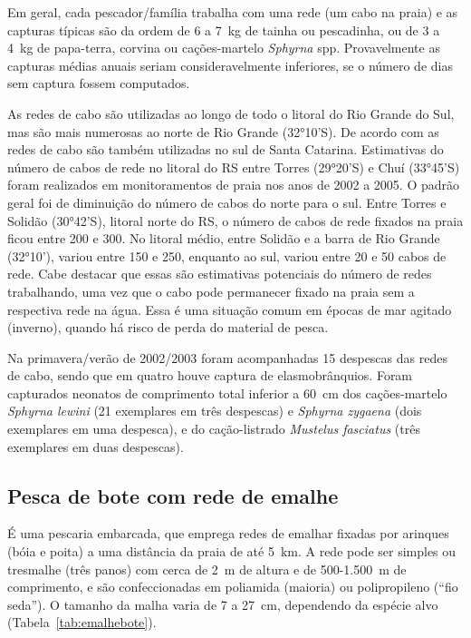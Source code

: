 \documentclass[a4paper,11pt,twoside,showtrims,onecolumn,openright,final]{memoir}
\begin{document}
Em geral, cada pescador/família trabalha com uma rede (um cabo na praia) e as capturas
típicas são da ordem de 6 a 7~kg de tainha ou pescadinha, ou de 3 a 4~kg de papa-terra,
corvina ou cações-martelo \emph{Sphyrna} spp. Provavelmente as capturas médias anuais seriam
consideravelmente inferiores, se o número de dias sem captura fossem computados.

As redes de cabo são utilizadas ao longo de todo o litoral do Rio Grande do Sul,
mas são mais numerosas ao norte de Rio Grande (32°10'S). De acordo com \citet{branco1997}
as redes de cabo são também utilizadas no sul de Santa Catarina. Estimativas do número
de cabos de rede no litoral do RS entre Torres (29°20'S) e Chuí (33°45'S) 
foram realizados em monitoramentos de praia nos anos de 2002 a 2005. O padrão geral
foi de diminuição do número de cabos do norte para o sul. Entre Torres e Solidão (30°42'S), 
litoral norte do RS, o número de cabos de rede fixados na praia ficou entre 200 e 300.
No litoral médio, entre Solidão e a barra de Rio Grande (32°10'), variou entre 150 e 250,
enquanto ao sul, variou entre 20 e 50 cabos de rede. Cabe destacar que essas são estimativas
potenciais do número de redes trabalhando, uma vez que o cabo pode permanecer fixado na praia
sem a respectiva rede na água. Essa é uma situação comum em épocas de mar agitado (inverno), quando 
há risco de perda do material de pesca. 

Na primavera/verão de 2002/2003 foram acompanhadas 15 despescas das redes de cabo, 
sendo que em quatro houve captura de elasmobrânquios. Foram capturados
neonatos de comprimento total inferior a 60~cm dos 
cações-martelo \emph{Sphyrna lewini} (21 exemplares em três despescas) e
\emph{Sphyrna zygaena} (dois exemplares em uma despesca), e do
cação-listrado \emph{Mustelus fasciatus} (três exemplares em duas despescas).


\subsection*{Pesca de bote com rede de emalhe}

É uma pescaria embarcada, que emprega redes de emalhar fixadas 
por arinques (bóia e poita) a uma distância da praia de até 5~km. %
A rede pode ser simples ou tresmalhe (três panos) com cerca 
de 2~m de altura e de 500-1.500~m de comprimento, e são confeccionadas 
em poliamida (maioria) ou polipropileno (``fio seda''). 
O tamanho da malha varia de 7 a 27~cm, dependendo 
da espécie alvo (Tabela~\ref{tab:emalhebote}).
\end{document}
